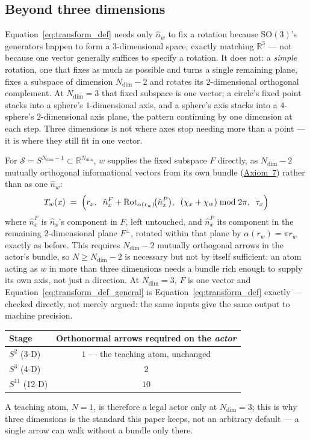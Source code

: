 \documentclass[12pt, a4paper]{article}
\begin{document}
\subsection{Beyond three dimensions}
\label{subsec:transform_higher_dim}
Equation~\eqref{eq:transform_def} needs only $\hat n_w$ to fix a
rotation because $\mathrm{SO}(3)$'s generators happen to form a
$3$-dimensional space, exactly matching $\mathbb{R}^3$ --- not
because one vector generally suffices to specify a rotation. It does
not: a \emph{simple} rotation, one that fixes as much as possible and
turns a single remaining plane, fixes a subspace of dimension
$N_{\mathrm{dim}}-2$ and rotates its $2$-dimensional orthogonal
complement. At $N_{\mathrm{dim}}=3$ that fixed subspace is one
vector; a circle's fixed point stacks into a sphere's
$1$-dimensional axis, and a sphere's axis stacks into a $4$-sphere's
$2$-dimensional axis plane, the pattern continuing by one dimension
at each step. Three dimensions is not where axes stop needing more
than a point --- it is where they still fit in one vector.

For $\mathcal{S}=S^{N_{\mathrm{dim}}-1}\subset\mathbb{R}^{N_{\mathrm{dim}}}$,
$w$ supplies the fixed subspace $F$ directly, as $N_{\mathrm{dim}}-2$
mutually orthogonal informational vectors from its own bundle
(\hyperref[subsec:axiom_v1_metrics]{Axiom~7}) rather than as one $\hat n_w$:
\begin{equation}
    T_w(x)
    \;=\;
    \Bigl(
        r_x,\;\;
        \hat n_x^F + \mathrm{Rot}_{\alpha(r_w)}\!\bigl(\hat n_x^P\bigr),\;\;
        (\chi_x + \chi_w) \bmod 2\pi,\;\;
        \tau_x
    \Bigr)
    \label{eq:transform_def_general}
\end{equation}
where $\hat n_x^F$ is $\hat n_x$'s component in $F$, left untouched,
and $\hat n_x^P$ its component in the remaining $2$-dimensional plane
$F^\perp$, rotated within that plane by $\alpha(r_w)=\pi r_w$ exactly
as before. This requires $N_{\mathrm{dim}}-2$ mutually orthogonal
arrows in the actor's bundle, so $N\ge N_{\mathrm{dim}}-2$ is
necessary but not by itself sufficient: an atom acting as
$w$ in more than three dimensions needs a bundle rich enough to
supply its own axis, not just a direction. At $N_{\mathrm{dim}}=3$,
$F$ is one vector and Equation~\eqref{eq:transform_def_general} is
Equation~\eqref{eq:transform_def} exactly --- checked directly, not
merely argued: the same inputs give the same output to machine
precision.

\begin{center}
\begin{tabular}{lc}
Stage & Orthonormal arrows required on the \emph{actor} \\
\hline
$S^2$ (3-D) & $1$ --- the teaching atom, unchanged \\
$S^3$ (4-D) & $2$ \\
$S^{11}$ (12-D) & $10$ \\
\end{tabular}
\end{center}
A teaching atom, $N=1$, is therefore a legal actor only at
$N_{\mathrm{dim}}=3$; this is why three dimensions is the standard
this paper keeps, not an arbitrary default --- a single arrow can
walk without a bundle only there.
\end{document}
